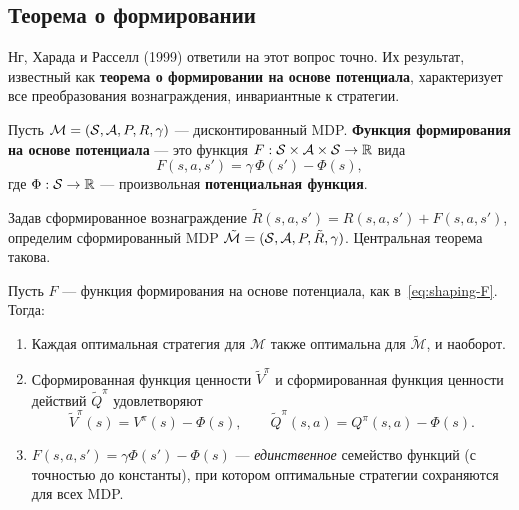 \subsection{Теорема о формировании}

Нг, Харада и Расселл (1999) ответили на этот вопрос точно. Их результат, известный как \textbf{теорема о формировании на основе потенциала}, характеризует все преобразования вознаграждения, инвариантные к стратегии.

\begin{definition}
\label{def:shaping-function}
Пусть $\mathcal{M} = (\mathcal{S}, \mathcal{A}, P, R, \gamma)$ --- дисконтированный MDP. \textbf{Функция формирования на основе потенциала} --- это функция $F : \mathcal{S} \times \mathcal{A} \times \mathcal{S} \to \mathbb{R}$ вида
\begin{equation}
\label{eq:shaping-F}
F(s, a, s') = \gamma\,\Phi(s') - \Phi(s),
\end{equation}
где $\Phi : \mathcal{S} \to \mathbb{R}$ --- произвольная \textbf{потенциальная функция}.
\end{definition}

Задав сформированное вознаграждение $\tilde{R}(s,a,s') = R(s,a,s') + F(s,a,s')$, определим сформированный MDP $\tilde{\mathcal{M}} = (\mathcal{S}, \mathcal{A}, P, \tilde{R}, \gamma)$. Центральная теорема такова.

\begin{theorem}
\label{thm:shaping}
Пусть $F$ --- функция формирования на основе потенциала, как в~\eqref{eq:shaping-F}. Тогда:
\begin{enumerate}
  \item Каждая оптимальная стратегия для $\mathcal{M}$ также оптимальна для $\tilde{\mathcal{M}}$, и наоборот.
  \item Сформированная функция ценности $\tilde{V}^\pi$ и сформированная функция ценности действий $\tilde{Q}^\pi$ удовлетворяют
    \begin{equation}
    \label{eq:shaped-values}
    \tilde{V}^\pi(s) = V^\pi(s) - \Phi(s), \qquad
    \tilde{Q}^\pi(s,a) = Q^\pi(s,a) - \Phi(s).
    \end{equation}
  \item $F(s,a,s') = \gamma\Phi(s') - \Phi(s)$ --- \emph{единственное} семейство функций (с точностью до константы), при котором оптимальные стратегии сохраняются для всех MDP.
\end{enumerate}
\end{theorem}

